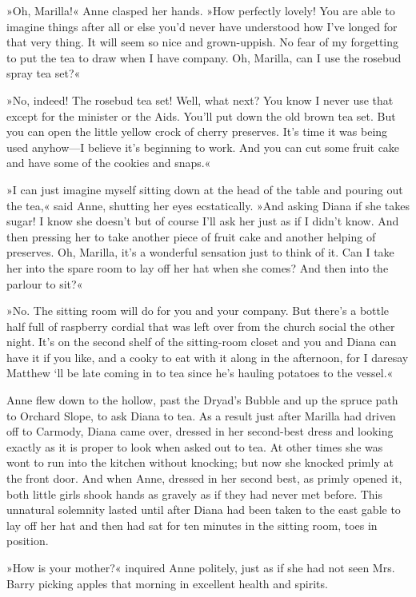 »Oh, Marilla!« Anne clasped her hands. »How perfectly lovely! You are able to imagine things after all or else you'd never have understood how I've longed for that very thing. It will seem so nice and grown-uppish. No fear of my forgetting to put the tea to draw when I have company. Oh, Marilla, can I use the rosebud spray tea set?«

»No, indeed! The rosebud tea set! Well, what next? You know I never use that except for the minister or the Aids. You'll put down the old brown tea set. But you can open the little yellow crock of cherry preserves. It's time it was being used anyhow—I believe it's beginning to work. And you can cut some fruit cake and have some of the cookies and snaps.«

»I can just imagine myself sitting down at the head of the table and pouring out the tea,« said Anne, shutting her eyes ecstatically. »And asking Diana if she takes sugar! I know she doesn't but of course I'll ask her just as if I didn't know. And then pressing her to take another piece of fruit cake and another helping of preserves. Oh, Marilla, it's a wonderful sensation just to think of it. Can I take her into the spare room to lay off her hat when she comes? And then into the parlour to sit?«

»No. The sitting room will do for you and your company. But there's a bottle half full of raspberry cordial that was left over from the church social the other night. It's on the second shelf of the sitting-room closet and you and Diana can have it if you like, and a cooky to eat with it along in the afternoon, for I daresay Matthew `ll be late coming in to tea since he's hauling potatoes to the vessel.«

Anne flew down to the hollow, past the Dryad's Bubble and up the spruce path to Orchard Slope, to ask Diana to tea. As a result just after Marilla had driven off to Carmody, Diana came over, dressed in her second-best dress and looking exactly as it is proper to look when asked out to tea. At other times she was wont to run into the kitchen without knocking; but now she knocked primly at the front door. And when Anne, dressed in her second best, as primly opened it, both little girls shook hands as gravely as if they had never met before. This unnatural solemnity lasted until after Diana had been taken to the east gable to lay off her hat and then had sat for ten minutes in the sitting room, toes in position.

»How is your mother?« inquired Anne politely, just as if she had not seen Mrs. Barry picking apples that morning in excellent health and spirits.

